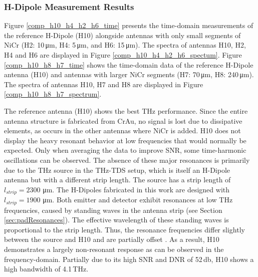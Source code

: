 \subsubsection{H-Dipole Measurement Results}

Figure \ref{comp_h10_h4_h2_h6_time} presents the time-domain measurements of the reference H-Dipole (H10) alongside antennas with only small segments of NiCr (H2: \num{10}\,\si{\micro \meter}, H4: \num{5}\,\si{\micro \meter}, and H6: \num{15}\,\si{\micro \meter}). The spectra of antennas H10, H2, H4 and H6 are displayed in Figure \ref{comp_h10_h4_h2_h6_spectum}. Figure \ref{comp_h10_h8_h7_time} shows the time-domain data of the reference H-Dipole antenna (H10) and antennas with larger NiCr segments (H7: \num{70}\,\si{\micro \meter}, H8: \num{240}\,\si{\micro \meter}). The spectra of antennas H10, H7 and H8 are displayed in Figure \ref{comp_h10_h8_h7_spectrum}. 

The reference antenna (H10) shows the best THz performance. Since the entire antenna structure is fabricated from CrAu, no signal is lost due to dissipative elements, as occurs in the other antennas where NiCr is added. H10 does not display the heavy resonant behavior at low frequencies that would normally be expected. Only when averaging the data to improve SNR, some time-harmonic oscillations can be observed. The absence of these major  resonances is primarily due to the THz source in the THz-TDS setup, which is itself an H-Dipole antenna but with a different strip length. The source has a strip length of $l_{strip} = 2300$ \si{\micro\meter}. The H-Dipoles fabricated in this work are designed with $l_{strip} = 1900$ \si{\micro\meter}. Both emitter and detector exhibit resonances at low THz frequencies, caused by standing waves in the antenna strip (see Section \ref{sec:padResonances}). The effective wavelength of these standing waves is proportional to the strip length. Thus, the resonance frequencies differ slightly between the source and H10 and are partially offset \cite{nandiErAsInAlGaAsPhotoconductors2021}. As a result, H10 demonstrates a largely non-resonant response as can be observed in the frequency-domain. Partially due to its high SNR and DNR of \num{52}\,\si{\decibel}, H10 shows a high bandwidth of \num{4.1}\,\si{\tera \hertz}. 

